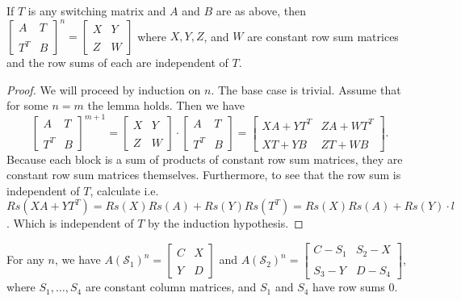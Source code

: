 \begin{lemma}\label{lemma:SwitchedPowers1}
    If $T$ is any switching matrix and $A$ and $B$ are as above, then $\begin{bmatrix}
      A & T \\\\
      T^T & B
    \end{bmatrix}^n = \begin{bmatrix}
      X & Y \\\\
      Z & W
    \end{bmatrix}$ where $X, Y, Z$, and $W$ are constant row sum matrices and the row sums of each are independent of $T$.
\end{lemma}

\begin{proof} We will proceed by induction on $n$. The base case is trivial. Assume that for some $n = m$ the lemma holds. Then we have
  $$
    \begin{bmatrix}
      A & T \\\\
      T^T & B
    \end{bmatrix}^{m+1} = \begin{bmatrix}
      X & Y \\\\
      Z & W
    \end{bmatrix} \cdot \begin{bmatrix}
      A & T \\\\
      T^T & B
    \end{bmatrix} = \begin{bmatrix}
      XA + YT^T & ZA + WT^T \\\\
      XT + YB & ZT + WB
    \end{bmatrix}.
  $$
  Because each block is a sum of products of constant row sum matrices, they are constant row sum matrices themselves. Furthermore, to see that the row sum is independent of $T$, calculate i.e. $Rs(XA + YT^T) = Rs(X)Rs(A) + Rs(Y)Rs(T^T) = Rs(X)Rs(A) + Rs(Y) \cdot l$. Which is independent of $T$ by the induction hypothesis.
\end{proof}


\begin{lemma}\label{lemma:SwitchedPowers2}
  For any $n$, we have $A(\mathcal{S}_1)^n = \begin{bmatrix}
    C & X \\\\
    Y & D
  \end{bmatrix}$ and $A(\mathcal{S}_2)^n = \begin{bmatrix}
    C - S_1 & S_2 - X \\\\
    S_3 - Y & D - S_4
  \end{bmatrix}$, where $S_1,\ldots,S_4$ are constant column matrices, and $S_1$ and $S_4$ have row sums $0$.
\end{lemma}

